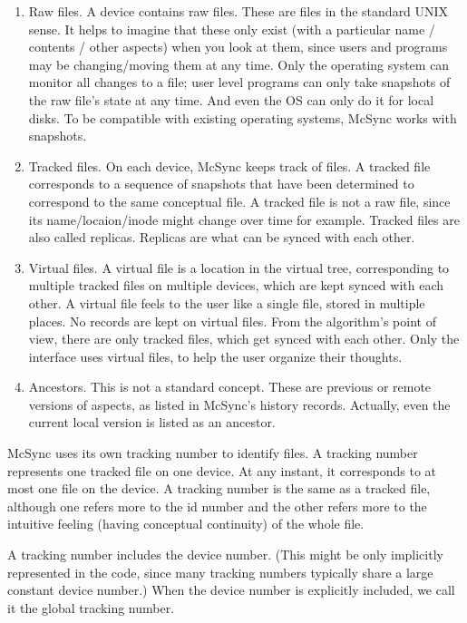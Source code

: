 \documentclass{book}
\begin{document}
\begin{enumerate}

\item
Raw files.  A device contains raw files.  These are files in the standard UNIX sense.  It helps to imagine that these only exist (with a particular name / contents / other aspects) when you look at them, since users and programs may be changing/moving them at any time.  Only the operating system can monitor all changes to a file; user level programs can only take snapshots of the raw file's state at any time.  And even the OS can only do it for local disks.  To be compatible with existing operating systems, McSync works with snapshots.

\item
Tracked files.  On each device, McSync keeps track of files.  A tracked file corresponds to a sequence of snapshots that have been determined to correspond to the same conceptual file.  A tracked file is not a raw file, since its name/locaion/inode might change over time for example.  Tracked files are also called replicas.  Replicas are what can be synced with each other.

\item
Virtual files.  A virtual file is a location in the virtual tree, corresponding to multiple tracked files on multiple devices, which are kept synced with each other.  A virtual file feels to the user like a single file, stored in multiple places.  No records are kept on virtual files.  From the algorithm's point of view, there are only tracked files, which get synced with each other.  Only the interface uses virtual files, to help the user organize their thoughts.

\item
Ancestors.  This is not a standard concept.  These are previous or remote versions of aspects, as listed in McSync's history records.  Actually, even the current local version is listed as an ancestor.

\end{enumerate}

McSync uses its own tracking number to identify files.  A tracking number represents one tracked file on one device.  At any instant, it corresponds to at most one file on the device.  A tracking number is the same as a tracked file, although one refers more to the id number and the other refers more to the intuitive feeling (having conceptual continuity) of the whole file.

A tracking number includes the device number.  (This might be only implicitly represented in the code, since many tracking numbers typically share a large constant device number.)  When the device number is explicitly included, we call it the global tracking number.
\end{document}
